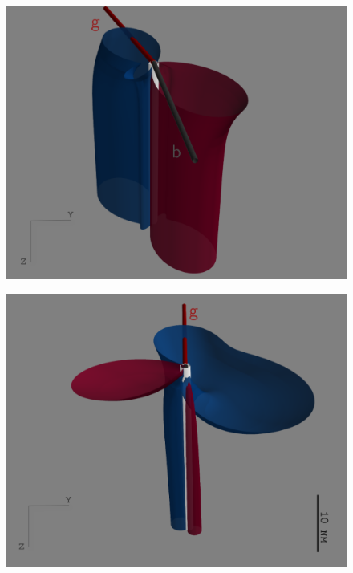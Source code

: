 \begin{figure}[ht]
\centering
\begin{minipage}{.5\textwidth}
  \centering
  \captionsetup{width=0.8\linewidth}
  \includegraphics[width=.95\linewidth]{Figures/edge.png}
  \label{fig:edge}
\end{minipage}%
\begin{minipage}{.5\textwidth}
  \centering
  \captionsetup{width=0.8\linewidth}
  \includegraphics[width=.95\linewidth]{Figures/screw.png}
  \label{fig:screw}
\end{minipage}
\end{figure} 




